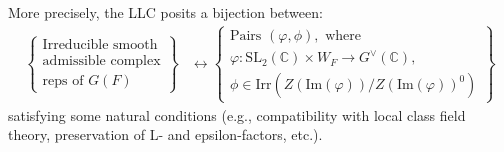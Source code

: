 \documentclass[25pt, a0paper, landscape]{tikzposter}
\newcommand{\SL}{\mathrm{SL}}
\newcommand{\CC}{\mathbb{C}}
\theoremstyle{definition}
\begin{document}
\begin{columns}
{    More precisely, the LLC posits a bijection between:
    \begin{align*}
        \left\{
        \begin{array}{c}
            \text{Irreducible smooth} \\
            \text{admissible complex} \\
            \text{reps of } G(F)
        \end{array}
        \right\} 
        &\leftrightarrow
        \left\{
        \begin{array}{c}
            \text{Pairs } (\varphi,\phi), \text{ where}\\
            \varphi: \SL_2(\CC)\times W_F \to G^\vee(\CC),\\
            \phi \in \mathrm{Irr}\left(Z(\mathrm{Im}(\varphi))/Z(\mathrm{Im}(\varphi))^0\right)
        \end{array}
        \right\}
    \end{align*}
    satisfying some natural conditions (e.g., compatibility with local class field theory, preservation of L- and epsilon-factors, etc.).
}


\end{columns}
\end{document}
